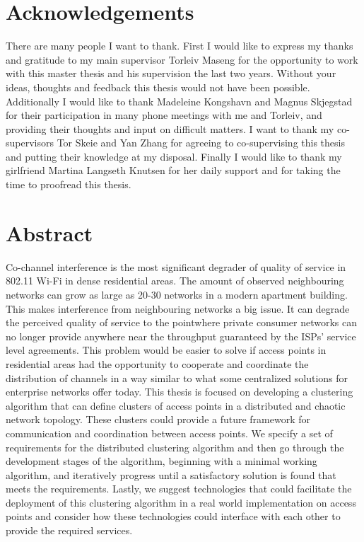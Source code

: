 \chapter*{Acknowledgements}
There are many people I want to thank.\newline
First I would like to express my thanks and gratitude to my main supervisor Torleiv Maseng for the opportunity to work with this master thesis and his supervision the last two years. Without
your ideas, thoughts and feedback this thesis would not have been possible. \newline
Additionally I would like to thank Madeleine Kongshavn and Magnus Skjegstad for their participation in many phone meetings with me and Torleiv, and providing their thoughts and
input on difficult matters. \newline
I want to thank my co-supervisors Tor Skeie and Yan Zhang for agreeing to co-supervising this thesis and putting their knowledge at my disposal. 
\newline
Finally I would like to thank my girlfriend Martina Langseth Knutsen for her daily support and for taking the time to proofread this thesis.




\chapter*{Abstract}
Co-channel interference is the most significant degrader of quality of service in 802.11 Wi-Fi in dense residential areas.
The amount of observed neighbouring networks can grow as large as 20-30 networks in a modern apartment building. This makes
interference from neighbouring networks a big issue. It can degrade the perceived quality of service to the pointwhere private consumer networks can no longer provide
anywhere near the throughput guaranteed by the ISPs' service level agreements. This problem would be easier to solve if access points in residential areas had the
opportunity to cooperate and coordinate the distribution of channels in a way similar to what some centralized solutions for enterprise networks offer today.
This thesis is focused on developing a clustering algorithm that can define clusters of access points in a distributed and chaotic network topology. These clusters could 
provide a future framework for communication and coordination between access points.
We specify a set of requirements for the distributed clustering algorithm and then go through the development stages of the algorithm,
beginning with a minimal working algorithm, and iteratively progress until a satisfactory solution is found that meets the requirements.
Lastly, we suggest technologies that could facilitate the deployment of this clustering algorithm in a real world implementation on access points and consider
how these technologies could interface with each other to provide the required services.
